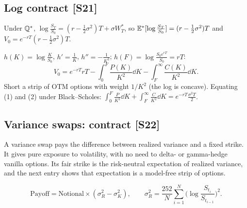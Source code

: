 \documentclass[10pt]{article}
\begin{document}
\subsection{Log contract [S21]}
\begin{deriv}
Under $\mathbb{Q}^*$, $\log\frac{S_T}{S_0}=(r-\frac12\sigma^2)T+\sigma W^*_T$, so $\mathbb{E}^*[\log\frac{S_T}{S_0}]=(r-\frac12\sigma^2)T$ and $V_0=e^{-rT}(r-\frac12\sigma^2)T$.
\end{deriv}
\begin{deriv}
$h(K)=\log\frac{K}{S_0}$, $h'=\frac1K$, $h''=-\frac1{K^2}$; $h(F)=\log\frac{S_0e^{rT}}{S_0}=rT$:
\[V_0=e^{-rT}rT-\int_0^F\frac{P(K)}{K^2}\dd K-\int_F^\infty\frac{C(K)}{K^2}\dd K.\]
Short a strip of OTM options with weight $1/K^2$ (the log is concave). Equating (1) and (2) under Black--Scholes: $\int_0^F\frac{P}{K^2}\dd K+\int_F^\infty\frac{C}{K^2}\dd K=e^{-rT}\frac{\sigma^2T}{2}$.
\end{deriv}

\subsection{Variance swaps: contract [S22]}
\begin{idea}
A variance swap pays the difference between realized variance and a fixed strike. It gives pure exposure to volatility, with no need to delta- or gamma-hedge vanilla options. Its fair strike is the risk-neutral expectation of realized variance, and the next entry shows that expectation is a model-free strip of options.
\end{idea}
\[\text{Payoff}=\text{Notional}\times(\sigma_R^2-\sigma_K^2),\qquad \sigma_R^2=\frac{252}{N}\sum_{i=1}^N\Big(\log\frac{S_{t_i}}{S_{t_{i-1}}}\Big)^2.\]
\begin{where}
\end{where}
\end{document}
